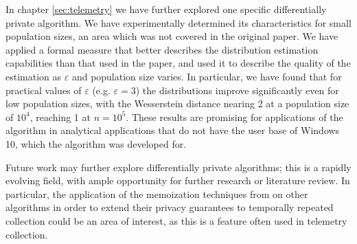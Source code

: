 \documentclass[12pt]{article}
\renewcommand{\epsilon}{\varepsilon}
\begin{document}
In chapter \ref{sec:telemetry} we have further explored one specific differentially private algorithm. We have experimentally determined its characteristics for small population sizes, an area which was not covered in the original paper. We have applied a formal measure that better describes the distribution estimation capabilities than that used in the paper, and used it to describe the quality of the estimation as $\epsilon$ and population size varies. In particular, we have found that for practical values of $\epsilon$ (e.g. $\epsilon = 3$) the distributions improve significantly even for low population sizes, with the Wesserstein distance nearing 2 at a population size of $10^4$, reaching 1 at $n=10^5$. These results are promising for applications of the algorithm in analytical applications that do not have the user base of Windows 10, which the algorithm was developed for.

\bigskip

Future work may further explore differentially private algorithms; this is a rapidly evolving field, with ample opportunity for further research or literature review. In particular, the application of the memoization techniques from \cite{microsoft_telemetry} on other algorithms in order to extend their privacy guarantees to temporally repeated collection could be an area of interest, as this is a feature often used in telemetry collection.

\printbibliography
\end{document}
